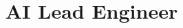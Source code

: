 \documentclass[11pt,a4paper]{moderncv}
\title{AI Lead Engineer}
\begin{document}
\makecvtitle





\end{document}
